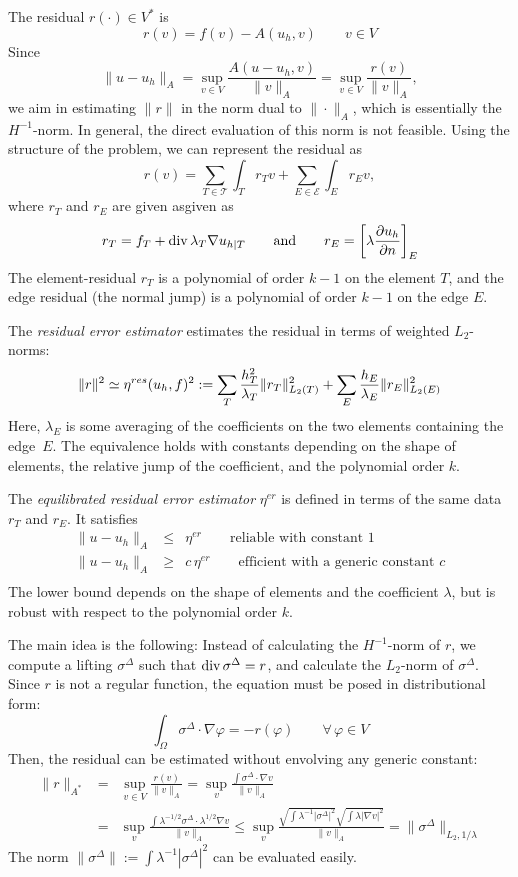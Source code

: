 \qquad

The residual $r(\cdot) \in V^*$ is 
$$
r(v) = f(v) - A(u_h, v) \qquad v \in V
$$
Since 
$$
\| u - u_h \|_A = \sup_{v \in V} \frac{A(u-u_h, v)}{\| v \|_A} = 
 \sup_{v \in V} \frac { r(v) }{\| v \|_A},
$$
we aim in estimating $\|r \|$ in the norm dual to $\| \cdot \|_A$, which is essentially the $H^{-1}$-norm. In general, the direct evaluation of this norm is not feasible.
Using the structure of the problem, we can represent the residual as
$$
r(v) = \sum_{T \in \mathcal{T}} \int_T r_T v + \sum_{E \in \mathcal{E}} \int_E r_E v,
$$
where $r_T$ and $r_E$ are given asgiven as
$$
r_T = f_T + \operatorname{div} \lambda_T \nabla u_{h|T}  \qquad \text{and} \qquad
r_E = \left[  \lambda \frac{\partial u_h} {\partial n}  \right]_E
$$
The element-residual $r_T$ is a polynomial of order $k-1$ on the element $T$, and the edge residual (the normal jump) is a polynomial of order $k-1$ on the edge $E$. 

The {\em residual error estimator} estimates the residual in terms of weighted $L_2$-norms:
$$
\| r \|^2 \simeq \eta^{res}(u_h, f)^2 := \sum_T \frac{ h_T^2}{\lambda_T}  \| r_T \|_{L_2(T)}^2 + \sum_E \frac{ h_E }{\lambda_E} \| r_E \|_{L_2(E)}^2
$$
Here, $\lambda_E$ is some averaging of the coefficients on the two elements containing the edge~$E$. The equivalence holds with constants depending on the shape of elements, the relative jump of the coefficient, and the polynomial order $k$.


The {\em equilibrated residual error estimator} $\eta^{er}$ is defined in terms of the same data $r_T$ and $r_E$. It satisfies
\begin{eqnarray*}
\| u - u_h \|_A & \leq & \eta^{er} \qquad \text{reliable with constant 1} \\
\| u - u_h \|_A & \geq & c \, \eta^{er} \qquad \text{efficient with a generic constant $c$} \\
\end{eqnarray*}
The lower bound depends on the shape of elements and the coefficient $\lambda$, but is robust with respect to the polynomial order $k$.

The main idea is the following: Instead of calculating the $H^{-1}$-norm of $r$, we compute a lifting $\sigma^\Delta$ such that $\operatorname{div} \sigma^\Delta = r$, and calculate the $L_2$-norm of $\sigma^\Delta$. Since $r$ is not a regular function, the equation must be posed in distributional form:
$$
\int_\Omega \sigma^\Delta \cdot \nabla \varphi = - r(\varphi) \qquad \forall \, \varphi \in V
$$
Then, the residual can be estimated without envolving any generic constant:
\begin{eqnarray*}
\| r \|_{A^\ast} & = & \sup_{v \in V} \frac{r(v)}{\| v \|_A} = \sup_v \frac{\int \sigma^\Delta \cdot \nabla v }{\|v \|_A} \\
&= & \sup_v \frac{\int \lambda^{-1/2} \sigma^\Delta \cdot \lambda^{1/2} \nabla v }{\|v \|_A}
\leq \sup_v \frac{\sqrt{\int \lambda^{-1} |\sigma^\Delta|^2}  \sqrt{ \int \lambda |\nabla v|^2 } }{\|v \|_A}
= \| \sigma^\Delta \|_{L_2, 1/\lambda}
\end{eqnarray*}
The norm $\| \sigma^\Delta \| := \int \lambda^{-1} | \sigma^\Delta|^2$ can be evaluated easily. 

